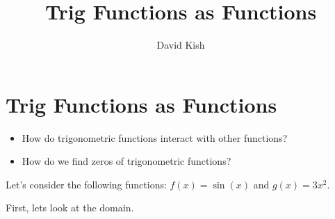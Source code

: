 \documentclass{ximera}
\author{David Kish}
\title{Trig Functions as Functions}
\begin{document}
\begin{abstract}
  
\end{abstract}
\maketitle

\section{Trig Functions as Functions}

\begin{motivatingQuestions}
\begin{itemize}
\item How do trigonometric functions interact with other functions?
\item How do we find zeros of trigonometric functions?
\end{itemize}
\end{motivatingQuestions}

\begin{example}
Let's consider the following functions: $f(x)=\sin{(x)}$ and $g(x)=3x^2$.
\\
\begin{explanation}
First, lets look at the domain.
\end{explanation}
\end{example}
\end{document}
